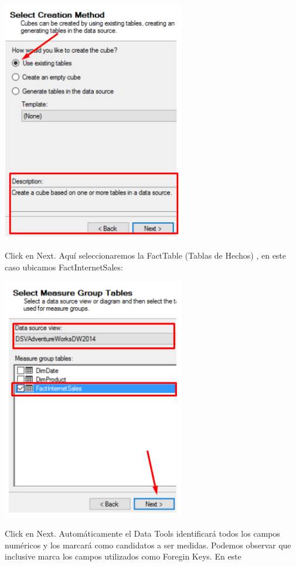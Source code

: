 	\begin{center}
	\includegraphics[width=8cm]{images/task3/img17}
	\end{center}	
Click en Next.
Aquí seleccionaremos la FactTable (Tablas de Hechos) , en este caso ubicamos FactInternetSales:
	\begin{center}
	\includegraphics[width=8cm]{images/task3/img18}
	\end{center}	
Click en Next.
Automáticamente el Data Tools identificará todos los campos numéricos y los marcará como candidatos a
ser medidas. Podemos observar que inclusive marca los campos utilizados como Foregin Keys. En este
